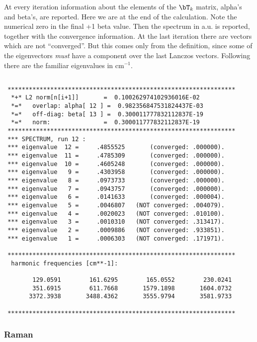 \documentclass[twoside,10pt,titlepage,a4paper]{article}
\begin{document}
At every iteration information about the elements of the $\bT_k$ matrix,
alpha's and beta's, are reported. Here we are at the end of the
calculation. Note the numerical zero in the final +1 beta value.
Then the spectrum in a.u. is reported,
together with the convergence information. At the last iteration there
are vectors which are not ``converged''. But this comes only from
the definition, since some of the eigenvectors {\em must} have a
component over the last Lanczos vectors. Following there are the
familiar eigenvalues in cm$^{-1}$.
\verbatimsize\begin{verbatim}

 ****************************************************************
  *+* L2 norm[n[i+1]]       =  0.100262974102936016E-02
  *=*   overlap: alpha[ 12 ] =  0.982356847531824437E-03
  *=*   off-diag: beta[ 13 ] =  0.300011777832112837E-19
  *=*   norm:               =  0.300011777832112837E-19
 ****************************************************************
 *** SPECTRUM, run 12 :
 *** eigenvalue  12 =     .4855525       (converged: .000000).
 *** eigenvalue  11 =     .4785309       (converged: .000000).
 *** eigenvalue  10 =     .4605248       (converged: .000000).
 *** eigenvalue   9 =     .4303958       (converged: .000000).
 *** eigenvalue   8 =     .0973733       (converged: .000000).
 *** eigenvalue   7 =     .0943757       (converged: .000000).
 *** eigenvalue   6 =     .0141633       (converged: .000004).
 *** eigenvalue   5 =     .0046807   (NOT converged: .004079).
 *** eigenvalue   4 =     .0020023   (NOT converged: .010100).
 *** eigenvalue   3 =     .0010310   (NOT converged: .313417).
 *** eigenvalue   2 =     .0009886   (NOT converged: .933851).
 *** eigenvalue   1 =     .0006303   (NOT converged: .171971).

 ****************************************************************
  harmonic frequencies [cm**-1]:

        129.0591        161.6295        165.0552        230.0241
        351.6915        611.7668       1579.1898       1604.0732
       3372.3938       3488.4362       3555.9794       3581.9733

 ****************************************************************

\end{verbatim}\eofverbsize

\subsubsection{Raman}
\end{document}
